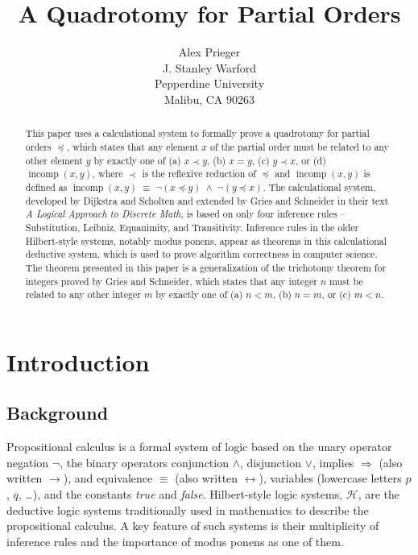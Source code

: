 \documentclass[12pt, fleqn, leqno]{article}
\title{A Quadrotomy for Partial Orders}
\author{
   Alex Prieger\\
   J. Stanley Warford\\
   Pepperdine University\\
   Malibu, CA 90263}
\date{} %
\newcommand{\equivs}{\ensuremath{\;\equiv\;}}       %
\newcommand{\lands}{\ensuremath{\;\land\;}}      %
\newcommand{\impl}{\ensuremath{\Rightarrow}}        %
\DeclareMathOperator{\incomp}{incomp}
\begin{document}
\maketitle
\begin{abstract}

This paper uses a calculational system to formally prove a quadrotomy for partial orders $\preceq$, which states that any element $x$ of the partial order must be related to any other element $y$ by exactly one of (a) $x \prec y$, (b) $x=y$, (c) $y\prec x$, or (d) $\incomp(x,y)$, where $\prec$ is the reflexive reduction of $\preceq$ and $\incomp(x,y)$ is defined as $\incomp(x,y) \equivs \neg (x\preceq y) \lands \neg (y\preceq x)$.
The calculational system, developed by Dijkstra and Scholten and extended by Gries and Schneider in their text \textit{A Logical Approach to Discrete Math}, is based on only four inference rules -- Substitution, Leibniz, Equanimity, and Transitivity. 
Inference rules in the older Hilbert-style systems, notably modus ponens, appear as theorems in this calculational deductive system, which is used to prove algorithm correctness in computer science.
The theorem presented in this paper is a generalization of the trichotomy theorem for integers proved by Gries and Schneider, which states that any integer $n$ must be related to any other integer $m$ by exactly one of (a) $n<m$, (b) $n=m$, or (c) $m<n$.

\end{abstract}

\thispagestyle{plain}

\section{Introduction}

\subsection{Background}

Propositional calculus is a formal system of logic based on the unary operator negation $\neg$,
the binary operators conjunction $\land$, disjunction $\lor$, implies $\impl$ (also written $\rightarrow$),
and equivalence $\equiv$ (also written $\leftrightarrow$),
variables (lowercase letters $p$, $q$, \dots), and the constants \textit{true} and \textit{false}.
Hilbert-style logic systems, $\mathcal{H}$, are the deductive logic systems traditionally used in mathematics to describe the propositional calculus.
A key feature of such systems is their multiplicity of inference rules and the importance of modus ponens as one of them.
\end{document}
